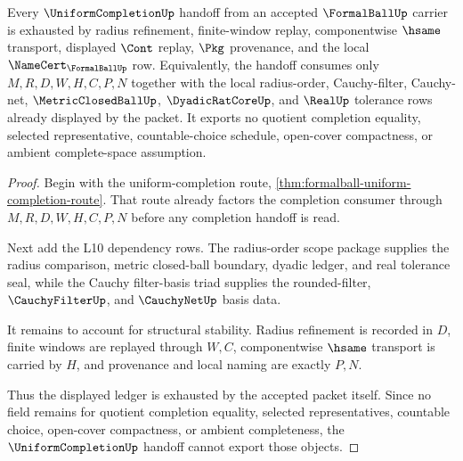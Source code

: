 \begin{theorem}
\label{thm:formalball-uniform-completion-ledger-exhaustion}
Every $\UniformCompletionUp$ handoff from an accepted $\FormalBallUp$ carrier is exhausted by radius refinement, finite-window replay, componentwise $\hsame$ transport, displayed $\Cont$ replay, $\Pkg$ provenance, and the local $\NameCert_{\FormalBallUp}$ row. Equivalently, the handoff consumes only $M,R,D,W,H,C,P,N$ together with the local radius-order, Cauchy-filter, Cauchy-net, $\MetricClosedBallUp$, $\DyadicRatCoreUp$, and $\RealUp$ tolerance rows already displayed by the packet. It exports no quotient completion equality, selected representative, countable-choice schedule, open-cover compactness, or ambient complete-space assumption.
\end{theorem}
\begin{proof}
Begin with the uniform-completion route, \autoref{thm:formalball-uniform-completion-route}. That route already factors the completion consumer through $M,R,D,W,H,C,P,N$ before any completion handoff is read.

Next add the L10 dependency rows. The radius-order scope package supplies the radius comparison, metric closed-ball boundary, dyadic ledger, and real tolerance seal, while the Cauchy filter-basis triad supplies the rounded-filter, $\CauchyFilterUp$, and $\CauchyNetUp$ basis data.

It remains to account for structural stability. Radius refinement is recorded in $D$, finite windows are replayed through $W,C$, componentwise $\hsame$ transport is carried by $H$, and provenance and local naming are exactly $P,N$.

Thus the displayed ledger is exhausted by the accepted packet itself. Since no field remains for quotient completion equality, selected representatives, countable choice, open-cover compactness, or ambient completeness, the $\UniformCompletionUp$ handoff cannot export those objects.
\end{proof}

